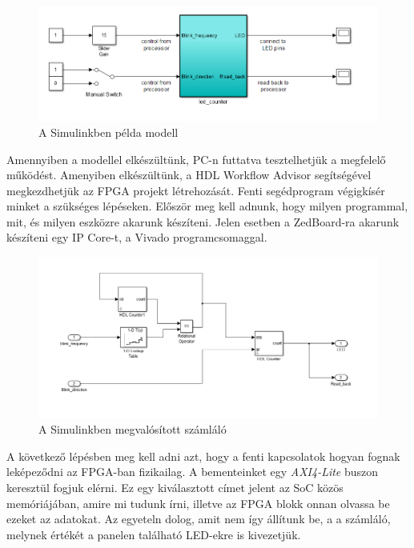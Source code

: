 \begin{figure}[!ht]
	\centering
	\includegraphics[width = \textwidth]{figures/simulink_1.png}
	\caption{A Simulinkben példa modell} 
	\label{fig:counter}
\end{figure}

Amennyiben a modellel elkészültünk, PC-n futtatva tesztelhetjük a megfelelő működést. Amenyiben elkészültünk, a HDL Workflow Advisor segítségével megkezdhetjük az FPGA projekt létrehozását. Fenti segédprogram végigkísér minket a szükséges lépéseken. Először meg kell adnunk, hogy milyen programmal, mit, és milyen eszközre akarunk készíteni. Jelen esetben a ZedBoard-ra akarunk készíteni egy IP Core-t, a Vivado programcsomaggal.

\begin{figure}[!ht]
	\centering
	\includegraphics[width = \textwidth]{figures/counter.png}
	\caption{A Simulinkben megvalósított számláló} 
	\label{fig:counter_sub}
\end{figure}

A következő lépésben meg kell adni azt, hogy a fenti kapcsolatok hogyan fognak leképeződni az FPGA-ban fizikailag. A bementeinket egy \emph{AXI4-Lite} buszon keresztül fogjuk elérni. Ez egy kiválasztott címet jelent az SoC közös memóriájában, amire mi tudunk írni, illetve az FPGA blokk onnan olvassa be ezeket az adatokat. Az egyeteln dolog, amit nem így állítunk be, a a számláló, melynek értékét a panelen található LED-ekre is kivezetjük.

